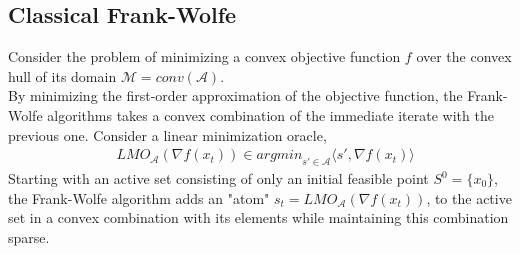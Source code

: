 \documentclass{article}
\begin{document}
\subsection{Classical Frank-Wolfe}
Consider the problem of minimizing a convex objective function $f$ over the convex hull of its domain $\mathcal{M}= conv(\mathcal{A})$.\\
By minimizing the first-order approximation of the objective function, the Frank-Wolfe algorithms takes a convex combination of the immediate iterate with the previous one. Consider a linear minimization oracle,
\begin{equation*}
\begin{aligned}
    &LMO_{\mathcal{A}}(\nabla f(x_{t}))\in \textit{argmin}_{s\prime\in\mathcal{A}}\langle s\prime, \nabla f(x_{t})\rangle
\end{aligned}    
\end{equation*}
Starting with an active set consisting of only an initial feasible point $S^{0}= \{x_{0}\}$, the Frank-Wolfe algorithm adds an "atom" $s_{t}= LMO_{\mathcal{A}}(\nabla f(x_{t}))$, to the active set in a convex combination with its elements while maintaining this combination sparse.
\end{document}

